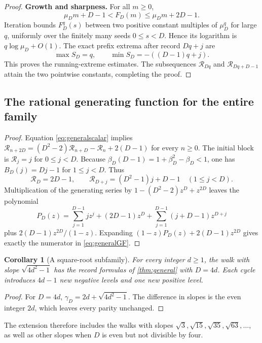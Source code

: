 \documentclass[11pt]{article}
\newtheorem{corollary}[theorem]{Corollary}
\theoremstyle{definition}
\numberwithin{equation}{section}
\newcommand{\Rs}{\mathcal R}
\begin{document}
\begin{proof}
\textbf{Growth and sharpness.}
For all $m\ge0$,
\begin{equation}\label{eq:generalbound}
 \mu_Dm+D-1<F_D(m)\le\mu_Dm+2D-1.
\end{equation}
Iteration bounds $F_D^q(s)$ between two positive constant multiples of $\mu_D^q$ for large $q$, uniformly over the finitely many seeds $0\le s<D$. Hence its logarithm is $q\log\mu_D+O(1)$. The exact prefix extrema after record $Dq+j$ are
\[
 \max S_D=q,\qquad \min S_D=-((D-1)q+j).
\]
This proves the running-extreme estimates. The subsequences $\Rs_{Dq}$ and $\Rs_{Dq+D-1}$ attain the two pointwise constants, completing the proof.
\end{proof}

\subsection{The rational generating function for the entire family}
\begin{proof}
Equation \eqref{eq:generalscalar} implies
$\Rs_{n+2D}=(D^2-2)\Rs_{n+D}-\Rs_n+2(D-1)$ for every $n\ge0$.
The initial block is $\Rs_j=j$ for $0\le j<D$. Because
$\beta_D(D-1)=1+\beta_D^2-\beta_D<1$, one has $B_D(j)=Dj-1$ for $1\le j<D$. Thus
\[
 \Rs_D=2D-1,\qquad
 \Rs_{D+j}=(D^2-1)j+D-1\quad(1\le j<D).
\]
Multiplication of the generating series by $1-(D^2-2)z^D+z^{2D}$ leaves the polynomial
\[
 P_D(z)=\sum_{j=1}^{D-1}jz^j+(2D-1)z^D
       +\sum_{j=1}^{D-1}(j+D-1)z^{D+j}
\]
plus $2(D-1)z^{2D}/(1-z)$. Expanding $(1-z)P_D(z)+2(D-1)z^{2D}$ gives exactly the numerator in \eqref{eq:generalGF}.
\end{proof}

\begin{corollary}[A square-root subfamily]
For every integer $d\ge1$, the walk with slope $\sqrt{4d^2-1}$ has the record formulas of \cref{thm:general} with $D=4d$. Each cycle introduces $4d-1$ new negative levels and one new positive level.
\end{corollary}
\begin{proof}
For $D=4d$, $\gamma_D=2d+\sqrt{4d^2-1}$. The difference in slopes is the even integer $2d$, which leaves every parity unchanged.
\end{proof}
The extension therefore includes the walks with slopes $\sqrt3,\sqrt{15},\sqrt{35},\sqrt{63},\ldots$, as well as other slopes when $D$ is even but not divisible by four.
\end{document}
